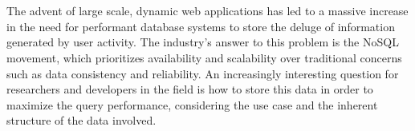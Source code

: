 
%
%

%



\chapter*{}

The advent of large scale, dynamic web applications has led to a massive increase in the need for performant database systems to store the deluge of information generated by user activity.
The industry's answer to this problem is the NoSQL movement, which prioritizes availability and scalability over traditional concerns such as data consistency and reliability.
An increasingly interesting question for researchers and developers in the field is how to store this data in order to maximize the query performance, considering the use case and the inherent structure of the data involved.

